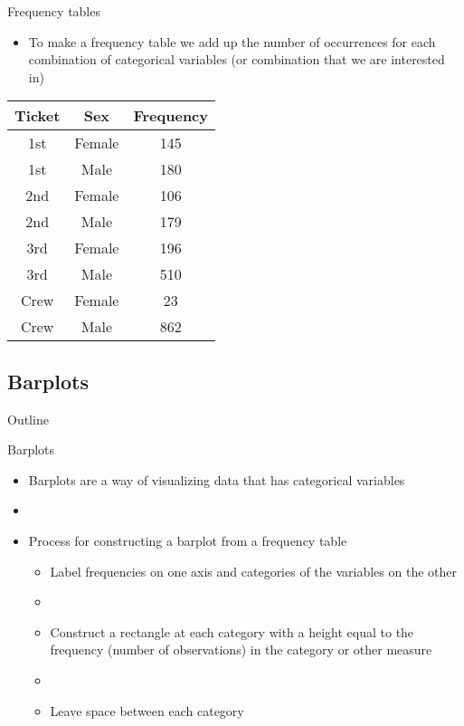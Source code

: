 \documentclass[xcolor=dvipsnames]{beamer}
\begin{document}
\begin{frame}{Frequency tables}
	\begin{itemize}
		\item To make a frequency table we add up the number of occurrences for each combination of categorical variables (or combination that we are interested in)
	\end{itemize}
\begin{center}
	\begin{tabular}{|c|c|c|}
		\hline
		\textbf{Ticket} & \textbf{Sex} & \textbf{Frequency} \\
		\hline \hline
		1st & Female & 145\\
		\hline
		1st &  Male & 180\\
		\hline
		2nd & Female & 106\\
		\hline
		2nd  & Male & 179\\
		\hline
		3rd & Female & 196\\
		\hline
		3rd  & Male & 510\\
		\hline
		Crew & Female &  23\\
		\hline
		Crew  & Male & 862\\
		\hline
	\end{tabular}
\end{center}
\end{frame}

\subsection{Barplots}
\begin{frame}{Outline}
\tableofcontents[currentsection,subsectionstyle=show/shaded/hide]
\end{frame}

\begin{frame}{Barplots}
\begin{itemize}
	\item Barplots are a way of visualizing data that has categorical variables
	\item[]
	\item Process for constructing a barplot from a frequency table
		\begin{itemize}
		\item Label frequencies on one axis and categories of the variables on the other
		\item[] 
		\item Construct a rectangle at each category with a height equal to the frequency (number of observations) in the category or other measure
		\item[]
		\item Leave space between each category
	\end{itemize}
\end{itemize}
\end{frame}
\end{document}
